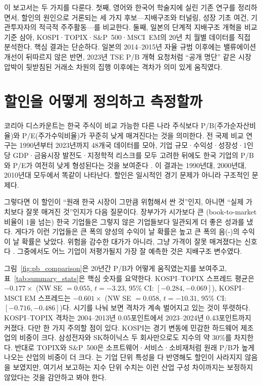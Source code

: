 \documentclass[12pt]{article}
\begin{document}
이 보고서는 두 가지를 다룬다. 첫째, 영어와 한국어 학술지에 실린 기존 연구를 정리하면서, 할인의 원인으로 거론되는 세 가지 후보---지배구조와 터널링, 성장 기초 여건, 기관투자자의 적극적 주주활동---를 비교한다. 둘째, 일본의 단계적 지배구조 개혁을 비교 기준 삼아, KOSPI·TOPIX·S\&P~500·MSCI~EM의 20년 치 월별 데이터를 직접 분석한다. 핵심 결과는 단순하다. 일본의 2014--2015년 자율 규범 이후에는 밸류에이션 개선이 뒤따르지 않은 반면, 2023년 TSE P/B 개혁 요청처럼 ``공개 명단'' 같은 시장 압박이 뒷받침된 거래소 차원의 집행 이후에는 격차가 의미 있게 움직였다.

\section{할인을 어떻게 정의하고 측정할까}
\label{sec:measurement}

코리아 디스카운트는 한국 주식이 비교 가능한 다른 나라 주식보다 P/B(주가순자산비율)와 P/E(주가수익비율)가 꾸준히 낮게 매겨진다는 것을 의미한다. 전 국제 비교 연구는 1990년부터 2023년까지 48개국 데이터를 모아, 기업 규모·수익성·성장성·1인당 GDP·금융시장 발전도·지정학적 리스크를 모두 고려한 뒤에도 한국 기업의 P/B와 P/E가 여전히 낮게 형성된다는 것을 보여준다 \citep{kim2026korean}. 이 결과는 1990년대, 2000년대, 2010년대 모두에서 똑같이 나타난다. 할인은 일시적인 경기 문제가 아니라 구조적인 문제다.

그렇다면 이 할인이 ``원래 한국 시장이 그만큼 위험해서 싼 것''인지, 아니면 ``실제 가치보다 잘못 매겨진 것''인지가 다음 질문이다. 장부가가 시가보다 큰 (book-to-market 비율이 1을 넘는) 한국 기업들은 그렇지 않은 기업들보다 일관되게 더 좋은 성과를 냈다. 게다가 이런 기업들은 큰 폭의 양성의 수익이 날 확률은 높고 큰 폭의 음(-)의 수익이 날 확률은 낮았다. 위험을 감수한 대가가 아니라, 그냥 가격이 잘못 매겨졌다는 신호다 \citep{jung2022korea}. 그중에서도 어느 기업이 저평가될지 가장 잘 예측한 것은 지배구조 변수였다.

그림~\ref{fig:pb_comparison}은 20년간 P/B가 어떻게 움직였는지를 보여주고, 표~\ref{tab:summary_stats}은 핵심 숫자를 요약한다. KOSPI--TOPIX 스프레드 평균은 $-0.177\times$ (NW SE $= 0.055$, $t=-3.23$, 95\% CI: $[-0.284, -0.069]$), KOSPI--MSCI EM 스프레드는 $-0.601\times$ (NW SE $= 0.058$, $t=-10.31$, 95\% CI: $[-0.716, -0.486]$)다. 시기를 나눠 보면 격차가 계속 벌어지고 있는 것이 뚜렷하다. KOSPI--TOPIX 격차는 2004--2013년 0.05포인트에서 2023--2024년 0.43포인트까지 커졌다. 다만 한 가지 주의할 점이 있다. KOSPI는 경기 변동에 민감한 하드웨어 제조업의 비중이 크다. 삼성전자와 SK하이닉스 두 회사만으로도 지수의 약 30\%를 차지한다. 반대로 TOPIX와 S\&P~500은 소프트웨어·서비스·소비재처럼 원래 P/B가 높게 나오는 산업의 비중이 더 크다. \citet{kim2026korean}는 기업 단위 특성을 다 반영해도 할인이 사라지지 않음을 보였지만, 여기서 보고하는 지수 단위 수치는 이런 산업 구성 차이까지는 보정하지 않았다는 것을 감안하고 봐야 한다.
\end{document}
